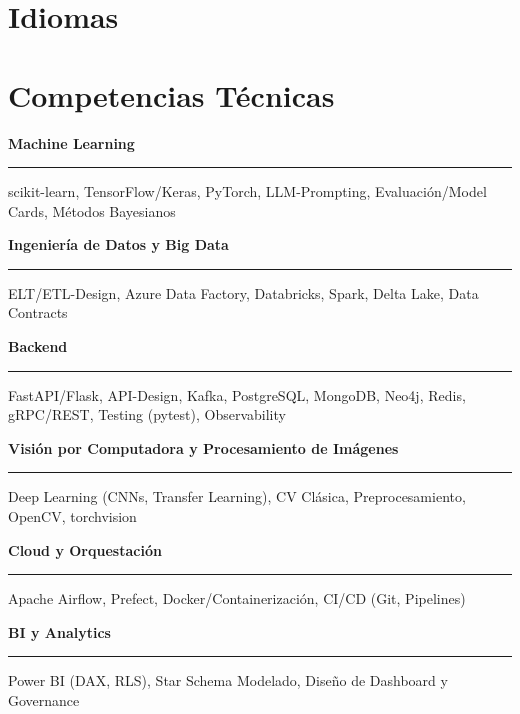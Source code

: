 \documentclass[11pt, a4paper, sans]{moderncv}
\begin{document}
    \section{Idiomas}

    \section{Competencias Técnicas}
        \noindent\textbf{Machine Learning}
        \nopagebreak[4]
        \hspace{0pt}\rule{\linewidth}{0.2pt}
        \nopagebreak[4]
        scikit-learn, TensorFlow/Keras, PyTorch, LLM-Prompting, Evaluación/Model Cards, Métodos Bayesianos
        \vspace{8pt}

        \noindent\textbf{Ingeniería de Datos y Big Data}
        \nopagebreak[4]
        \hspace{0pt}\rule{\linewidth}{0.2pt}
        \nopagebreak[4]
        ELT/ETL-Design, Azure Data Factory, Databricks, Spark, Delta Lake, Data Contracts
        \vspace{8pt}

        \noindent\textbf{Backend}
        \nopagebreak[4]
        \hspace{0pt}\rule{\linewidth}{0.2pt}
        \nopagebreak[4]
        FastAPI/Flask, API-Design, Kafka, PostgreSQL, MongoDB, Neo4j, Redis, gRPC/REST, Testing (pytest), Observability
        \vspace{8pt}

        \noindent\textbf{Visión por Computadora y Procesamiento de Imágenes}
        \nopagebreak[4]
        \hspace{0pt}\rule{\linewidth}{0.2pt}
        \nopagebreak[4]
        Deep Learning (CNNs, Transfer Learning), CV Clásica, Preprocesamiento, OpenCV, torchvision
        \vspace{8pt}

        \noindent\textbf{Cloud y Orquestación}
        \nopagebreak[4]
        \hspace{0pt}\rule{\linewidth}{0.2pt}
        \nopagebreak[4]
        Apache Airflow, Prefect, Docker/Containerización, CI/CD (Git, Pipelines)
        \vspace{8pt}

        \noindent\textbf{BI y Analytics}
        \nopagebreak[4]
        \hspace{0pt}\rule{\linewidth}{0.2pt}
        \nopagebreak[4]
        Power BI (DAX, RLS), Star Schema Modelado, Diseño de Dashboard y Governance
        \vspace{8pt}
\end{document}
